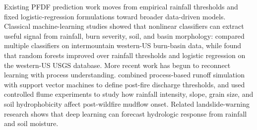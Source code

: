 


Existing PFDF prediction work moves from empirical rainfall thresholds and fixed logistic-regression formulations toward broader data-driven models. Classical machine-learning studies showed that nonlinear classifiers can extract useful signal from rainfall, burn severity, soil, and basin morphology: \cite{kern2017ml_pfdf} compared multiple classifiers on intermountain western-US burn-basin data, while \cite{nikolopoulos2018pfdf_rf} found that random forests improved over rainfall thresholds and logistic regression on the western-US USGS database. More recent work has begun to reconnect learning with process understanding. \cite{tang2023discharge_thresholds} combined process-based runoff simulation with support vector machines to define post-fire discharge thresholds, and \cite{movasat2026mudflow_ml} used controlled flume experiments to study how rainfall intensity, slope, grain size, and soil hydrophobicity affect post-wildfire mudflow onset. Related landslide-warning research shows that deep learning can forecast hydrologic response from rainfall and soil moisture.


